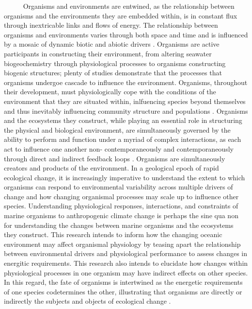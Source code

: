\documentclass[
  12pt,
]{article}
\begin{document}
~~~~~ Organisms and environments are entwined, as the relationship
between organisms and the environments they are embedded within, is in
constant flux through inextricable links and flows of energy. The
relationship between organisms and environments varies through both
space and time and is influenced by a mosaic of dynamic biotic and
abiotic drivers \citep{connell1977mechanisms, menge1987community}.
Organisms are active participants in constructing their environment,
from altering seawater biogeochemistry through physiological processes
to organisms constructing biogenic structures; plenty of studies
demonstrate that the processes that organisms undergoe cascade to
influence the environment\citep{lewontin1983organism,estes1974sea}.
Organisms, throughout their development, must physiologically cope with
the conditions of the environment that they are situated within,
inlfuencing species beyond themselves and thus inevitably influencing
community structure and populations \citep{bozinovic2015physiological}.
Organisms and the ecosystems they construct, while playing an essential
role in structuring the physical and biological environment, are
simultaneously governed by the ability to perform and function under a
myriad of complex interactions, as each act to influence one another
non- contemporaneously and contemporaneously through direct and indirect
feedback loops \citep{levin1974disturbance,paine1980food}. Organisms are
simultaneously creators and products of the environment. In a geological
epoch of rapid ecological change, it is increasingly imperative to
understand the extent to which organisms can respond to environmental
variability across multiple drivers of change and how changing
organismal processes may scale up to influence other species.
Understanding physiological responses, interactions, and constraints of
marine organisms to anthropogenic climate change is perhaps the sine qua
non for understanding the changes between marine organisms and the
ecosystems they construct. This research intends to inform how the
changing oceanic environment may affect organismal physiology by teasing
apart the relationship between environmental drivers and physiological
performance to assess changes in energitic requirements. This research
also intends to elucidate how changes within physiological processes in
one organism may have indirect effects on other species. In this regard,
the fate of organisms is intertwined as the energetic requirements of
one species codetermines the other, illustrating that organisms are
directly or indirectly the subjects and objects of ecological change
\citep{lewontin1983organism}.
\end{document}
